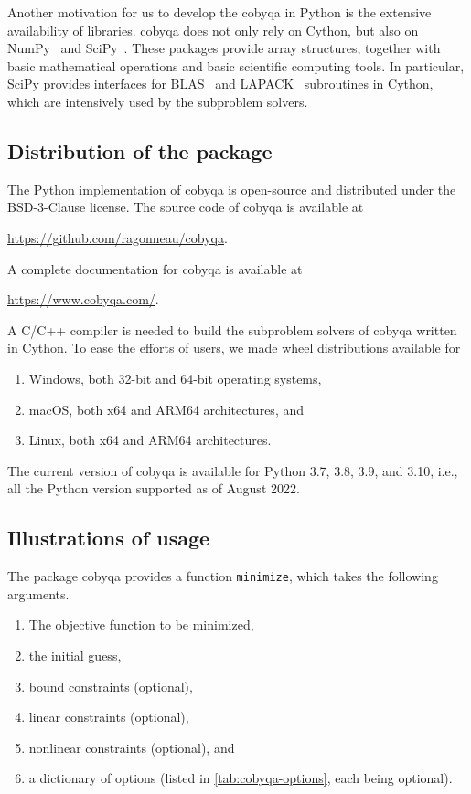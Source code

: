 Another motivation for us to develop the \gls{cobyqa} in Python is the extensive availability of libraries.
\Gls{cobyqa} does not only rely on Cython, but also on NumPy~\cite{Harris_Etal_2020} and SciPy~\cite{Virtanen_Etal_2020}.
These packages provide array structures, together with basic mathematical operations and basic scientific computing tools.
In particular, SciPy provides interfaces for BLAS~\cite{Blackford_Etal_2002} and LAPACK~\cite{Anderson_Etal_1999} subroutines in Cython, which are intensively used by the subproblem solvers.

\subsection{Distribution of the package}

The Python implementation of \gls{cobyqa} is open-source and distributed under the BSD-3-Clause license.
The source code of \gls{cobyqa} is available at
\begin{center}
    \url{https://github.com/ragonneau/cobyqa}.
\end{center}
A complete documentation for \gls{cobyqa} is available at
\begin{center}
    \url{https://www.cobyqa.com/}.
\end{center}

A C/C++ compiler is needed to build the subproblem solvers of \gls{cobyqa} written in Cython.
To ease the efforts of users, we made wheel distributions available for
\begin{enumerate}
    \item Windows, both 32-bit and 64-bit operating systems,
    \item macOS, both x64 and ARM64 architectures, and
    \item Linux, both x64 and ARM64 architectures.
\end{enumerate}
The current version of \gls{cobyqa} is available for Python 3.7, 3.8, 3.9, and 3.10, i.e., all the Python version supported as of August 2022.

\subsection{Illustrations of usage}

The package \gls{cobyqa} provides a function \texttt{minimize}, which takes the following arguments.
\begin{enumerate}
    \item The objective function to be minimized,
    \item the initial guess,
    \item bound constraints (optional),
    \item linear constraints (optional),
    \item nonlinear constraints (optional), and
    \item a dictionary of options (listed in \cref{tab:cobyqa-options}, each being optional).
\end{enumerate}

